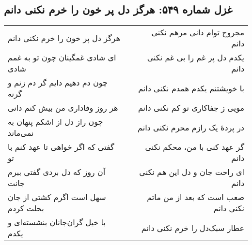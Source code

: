 \begin{center}
\section*{غزل شماره ۵۴۹: هرگز دل پر خون را خرم نکنی دانم}
\label{sec:549}
\begin{longtable}{l p{0.5cm} r}
هرگز دل پر خون را خرم نکنی دانم
&&
مجروح توام دانی مرهم نکنی دانم
\\
ای شادی غمگینان چون تو به غمم شادی
&&
یکدم دل پر غم را بی غم نکنی دانم
\\
چون دم دهیم دایم گر دم زنم و گرنه
&&
با خویشتنم یکدم همدم نکنی دانم
\\
هر روز وفاداری من بیش کنم دانی
&&
مویی ز جفاکاری تو کم نکنی دانم
\\
چون راز دل از اشکم پنهان به نمی‌ماند
&&
در پردهٔ یک رازم محرم نکنی دانم
\\
گفتی که اگر خواهی تا عهد کنم با تو
&&
گر عهد کنی با من، محکم نکنی دانم
\\
آن روز که دل بردی گفتی ببرم جانت
&&
ای راحت جان و دل این هم نکنی دانم
\\
سهل است اگرم کشتی از جان بحلت کردم
&&
صعب است که بعد از من ماتم نکنی دانم
\\
با خیل گران‌جانان بنشسته‌ای و یکدم
&&
عطار سبک‌دل را خرم نکنی دانم
\\
\end{longtable}
\end{center}
